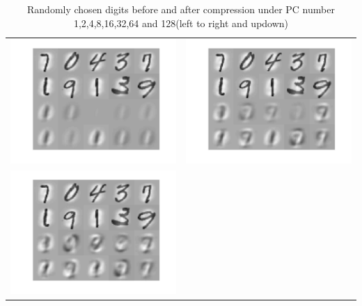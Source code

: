 \documentclass[paper=a4, fontsize=11pt]{scrartcl} %
\numberwithin{equation}{section} %
\numberwithin{figure}{section} %
\numberwithin{table}{section} %
\begin{document}
\begin{table}[H]
\caption{Randomly chosen digits before and after compression under PC number 1,2,4,8,16,32,64 and 128(left to right and updown)}
\centering
\begin{tabular}{cc}
	\includegraphics[scale=.3]{image_1}&
	\includegraphics[scale=.3]{image_2}\\
	\includegraphics[scale=.3]{image_4}&

\end{tabular}
\end{table}
\end{document}
